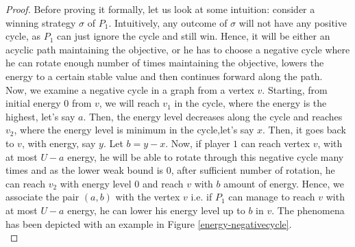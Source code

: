 \begin{proof}
  Before proving it formally, let us look at some intuition: consider a winning strategy $\sigma$ of $P_1$. Intuitively, any outcome of $\sigma$ will not have any positive cycle, as $P_1$ can just ignore the cycle and still win. Hence, it will be either an acyclic path maintaining the objective, or he has to choose a negative cycle where he can rotate enough number of times maintaining the objective, lowers the energy to a certain stable value and then continues forward along the path.\\
  \vskip 0.2cm
  Now, we examine a negative cycle in a graph from a vertex $v$. Starting, from initial energy $0$ from $v$, we will reach $v_1$ in the cycle, where the energy is the highest, let's say $a$. Then, the energy level decreases along the cycle and reaches $v_2$, where the energy level is minimum in the cycle,let's say $x$. Then, it goes back to $v$, with energy, say $y$. Let $b=y-x$. Now, if player $1$ can reach vertex $v$, with at most $U-a$ energy, he will be able to rotate through this negative cycle many times and as the lower weak bound is $0$, after sufficient number of rotation, he can reach $v_2$ with energy level $0$ and reach $v$ with $b$ amount of energy. Hence, we associate the pair $(a,b)$ with the vertex $v$ i.e. if $P_1$ can manage to reach $v$ with at most $U-a$ energy, he can lower his energy level up to $b$ in $v$. The phenomena has been depicted with an example in Figure \ref{energy-negativecycle}.\\
  

\end{proof}
